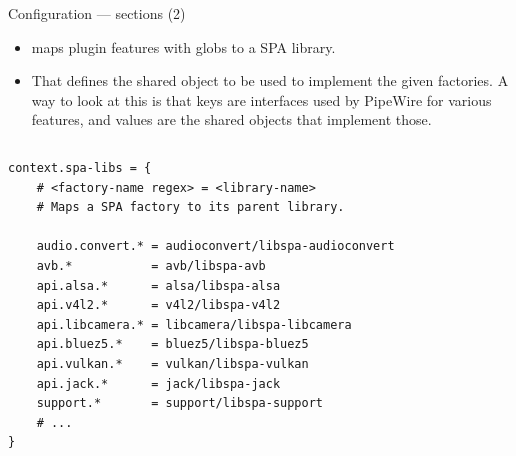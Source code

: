 \begin{frame}[fragile]{Configuration — sections (2)}

  \begin{itemize}
  \item {} maps plugin features with globs to a SPA
    library.
  \item That defines the shared object to be used to implement the
    given factories. A way to look at this is that keys are interfaces
    used by PipeWire for various features, and values are the shared
    objects that implement those.
  \end{itemize}

  \begin{columns}
    \begin{block}{}
      \fontsize{8}{8}\selectfont
        \begin{verbatim}
context.spa-libs = {
    # <factory-name regex> = <library-name>
    # Maps a SPA factory to its parent library.

    audio.convert.* = audioconvert/libspa-audioconvert
    avb.*           = avb/libspa-avb
    api.alsa.*      = alsa/libspa-alsa
    api.v4l2.*      = v4l2/libspa-v4l2
    api.libcamera.* = libcamera/libspa-libcamera
    api.bluez5.*    = bluez5/libspa-bluez5
    api.vulkan.*    = vulkan/libspa-vulkan
    api.jack.*      = jack/libspa-jack
    support.*       = support/libspa-support
    # ...
}
        \end{verbatim}
      \end{block}
  \end{columns}

\end{frame}




